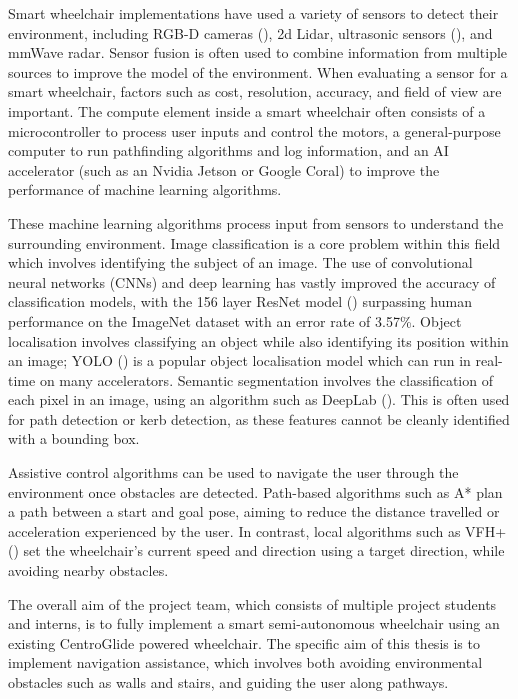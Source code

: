 \documentclass[10pt,twoside]{article}
\begin{document}
Smart wheelchair implementations have used a variety of sensors to detect their environment, including RGB-D cameras (\cite{wangS2P2SelfSupervisedGoalDirected2021}),
2d Lidar, ultrasonic sensors (\cite{levineNavChairAssistiveWheelchair1999}), and mmWave radar.
Sensor fusion is often used to combine information from multiple sources to improve the model of the environment.
When evaluating a sensor for a smart wheelchair, factors such as cost, resolution, accuracy, and field of view are important.
The compute element inside a smart wheelchair often consists of a microcontroller to process user inputs and control the motors,
a general-purpose computer to run pathfinding algorithms and log information, and an AI accelerator (such as an Nvidia Jetson or Google Coral)
to improve the performance of machine learning algorithms.

These machine learning algorithms process input from sensors to understand the surrounding environment.
Image classification is a core problem within this field which involves identifying the subject of an image.
The use of convolutional neural networks (CNNs) and deep learning has vastly improved the accuracy of
classification models, with the 156 layer ResNet model (\cite{heDeepResidualLearning2016}) surpassing human performance
on the ImageNet dataset with an error rate of 3.57\%.
Object localisation involves classifying an object while also identifying its position within an image;
YOLO (\cite{redmonYouOnlyLook2015}) is a popular object localisation model which can run in real-time on many accelerators.
Semantic segmentation involves the classification of each pixel in an image, using an algorithm such as DeepLab (\cite{chenRethinkingAtrousConvolution2017}).
This is often used for path detection or kerb detection, as these features cannot be cleanly identified with a bounding box.

Assistive control algorithms can be used to navigate the user through the environment once obstacles are detected.
Path-based algorithms such as A*
plan a path between a start and goal pose, aiming to reduce the distance travelled or acceleration experienced by the user.
In contrast, local algorithms such as VFH+ (\cite{ulrichVFHReliableObstacle1998})
set the wheelchair's current speed and direction using a target direction, while avoiding nearby obstacles.

The overall aim of the project team, which consists of multiple project students and interns,
is to fully implement a smart semi-autonomous wheelchair
using an existing CentroGlide powered wheelchair.
The specific aim of this thesis is to implement navigation assistance,
which involves both avoiding environmental obstacles such as walls and stairs,
and guiding the user along pathways.
\end{document}
